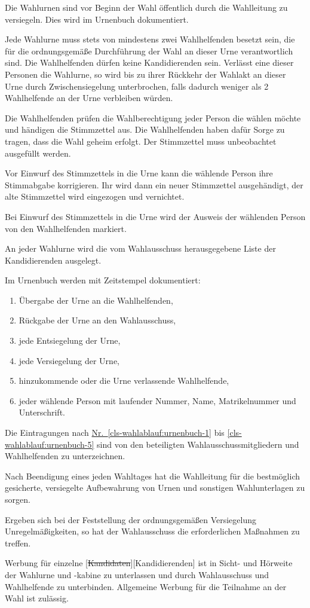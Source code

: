 \documentclass[%
draft,%
multilinesections%
]{fswo}
\newcommand\oldT[1]  {{\color{Gray}[\st{#1}]}}
\newcommand\newT[1]  {{\color{Green}[#1]}}
\newcommand\oldT[1]{}%
\newcommand\newT[1]{#1}
\newcommand\change[2]{\oldT{#1}\newT{#2}}
\newcommand*{\refItem}[1]{\hyperref[#1]{Nr.~\ref{#1}}}
\begin{document}
\begin{contract}
Die Wahlurnen sind vor Beginn der Wahl öffentlich durch die Wahlleitung zu versiegeln.
Dies wird im Urnenbuch dokumentiert.

Jede Wahlurne muss stets von mindestens zwei Wahlhelfenden besetzt sein, die für die ordnungsgemäße Durchführung der Wahl an dieser Urne verantwortlich sind.
Die Wahlhelfenden dürfen keine Kandidierenden sein.
Verlässt eine dieser Personen die Wahlurne, so wird bis zu ihrer Rückkehr der Wahlakt an dieser Urne durch Zwischensiegelung unterbrochen, falls dadurch weniger als 2 Wahlhelfende an der Urne verbleiben würden.

Die Wahlhelfenden prüfen die Wahlberechtigung jeder Person die wählen möchte und händigen die Stimmzettel aus.
Die Wahlhelfenden haben dafür Sorge zu tragen, dass die Wahl geheim erfolgt.
Der Stimmzettel muss unbeobachtet ausgefüllt werden.

Vor Einwurf des Stimmzettels in die Urne kann die wählende Person ihre Stimmabgabe korrigieren.
Ihr wird dann ein neuer Stimmzettel ausgehändigt, der alte Stimmzettel wird eingezogen und vernichtet.

Bei Einwurf des Stimmzettels in die Urne wird der Ausweis der wählenden Person von den Wahlhelfenden markiert.

An jeder Wahlurne wird die vom Wahlausschuss herausgegebene Liste der Kandidierenden ausgelegt.

Im Urnenbuch werden mit Zeitstempel dokumentiert:
\begin{enumerate}
\item Übergabe der Urne an die Wahlhelfenden,\label{cls-wahlablauf:urnenbuch-1}
\item Rückgabe der Urne an den Wahlausschuss,
\item jede Entsiegelung der Urne,
\item jede Versiegelung der Urne,
\item hinzukommende oder die Urne verlassende Wahlhelfende,\label{cls-wahlablauf:urnenbuch-5}
\item jeder wählende Person mit laufender Nummer, Name, Matrikelnummer und Unterschrift.
\end{enumerate}
Die Eintragungen nach \refItem{cls-wahlablauf:urnenbuch-1} bis \ref{cls-wahlablauf:urnenbuch-5} sind von den beteiligten Wahlausschussmitgliedern und Wahlhelfenden zu unterzeichnen.

Nach Beendigung eines jeden Wahltages hat die Wahlleitung für die bestmöglich gesicherte, versiegelte Aufbewahrung von Urnen und sonstigen Wahlunterlagen zu sorgen.

Ergeben sich bei der Feststellung der ordnungsgemäßen Versiegelung Unregelmäßigkeiten, so hat der Wahlausschuss die erforderlichen Maßnahmen zu treffen.

Werbung für einzelne \change{Kandidaten}{Kandidierenden} ist in Sicht- und Hörweite der Wahlurne und -kabine zu unterlassen und durch Wahlausschuss und Wahlhelfende zu unterbinden.
Allgemeine Werbung für die Teilnahme an der Wahl ist zulässig.
\end{contract}
\end{document}
